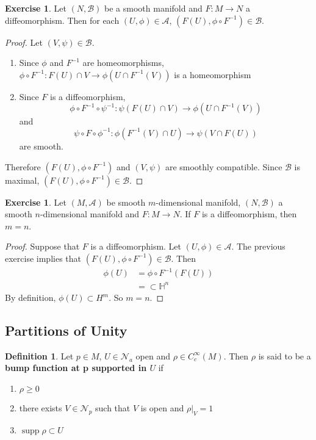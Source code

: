 \documentclass[12pt]{amsart}
\theoremstyle{definition}
\newtheorem{defn}[definition]{Definition}
\theoremstyle{definition}
\newtheorem{ex}[definition]{Exercise}
\renewcommand{\H}{\mathbb{H}}
\newcommand{\MA}{\mathcal{A}}
\newcommand{\MB}{\mathcal{B}}
\newcommand{\MN}{\mathcal{N}}
\DeclareMathOperator{\supp}{supp}
\begin{document}
	\begin{ex}
		Let $(N, \MB)$ be a smooth manifold and $F: M \rightarrow N$ a diffeomorphism. Then for each $(U, \phi) \in \MA$, $(F(U), \phi \circ F^{-1}) \in \MB$.
	\end{ex}
	
	\begin{proof}
		Let $(V, \psi) \in \MB$. 
		\begin{enumerate}
		\item Since $\phi$ and $F^{-1}$ are homeomorphisms, $\phi \circ F^{-1}: F(U) \cap V \rightarrow \phi(U \cap F^{-1}(V))$ is a homeomorphism
		\item Since $F$ is a diffeomorphism, $$\phi \circ F^{-1} \circ \psi^{-1}: \psi(F(U) \cap V) \rightarrow \phi(U \cap F^{-1}(V))$$ and $$\psi \circ F \circ \phi^{-1}: \phi(F^{-1}(V) \cap U) \rightarrow \psi(V \cap F(U))$$ are smooth. 
		\end{enumerate}
		
		Therefore $(F(U), \phi \circ F^{-1})$ and $(V, \psi)$ are smoothly compatible. Since $\MB$ is maximal, $(F(U), \phi \circ F^{-1}) \in \MB$.
	\end{proof}

	\begin{ex}
	Let $(M, \MA)$ be smooth $m$-dimensional manifold, $(N, \MB)$ a smooth $n$-dimensional manifold and $F: M \rightarrow N$. If $F$ is a diffeomorphism, then $m = n$.
	\end{ex}

	\begin{proof}
	Suppose that $F$ is a diffeomorphism. Let $(U, \phi) \in \MA$. The previous exercise implies that $(F(U), \phi \circ F^{-1}) \in \MB$. Then 
	\begin{align*}
	\phi(U)
	&= \phi \circ F^{-1}(F(U)) \\
	&= \subset \H^n
	\end{align*}	 
By definition, $\phi(U) \subset H^m$. So $m = n$.
	\end{proof}














\newpage 
\subsection{Partitions of Unity}
	
	\begin{defn}
	Let $p \in M$, $U \in \MN_a$ open and $\rho \in C_c^{\infty}(M)$. Then $\rho$ is said to be a \textbf{bump function at p supported in $U$} if 
	\begin{enumerate}
	\item $\rho \geq 0$ 
	\item there exists $V \in \MN_p$ such that $V$ is open and $\rho|_V = 1$ 
	\item $\supp \rho \subset U$
	\end{enumerate}
	\end{defn}
	
\end{document}
